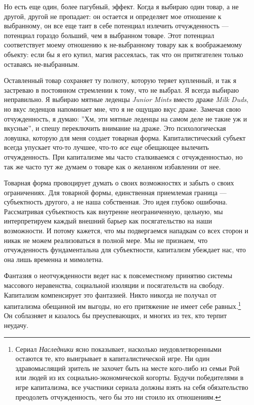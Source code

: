 \documentclass[12pt]{book}
\begin{document}
Но есть еще один, более пагубный, эффект. Когда я выбираю один товар, а не другой, другой не пропадает: он остается и определяет мое отношение к выбранному, он все еще таит в себе потенциал излечить отчужденность --- потенциал гораздо больший, чем в выбранном товаре. Этот потенциал соответствует моему отношению к не-выбранному товару как к воображаемому объекту: если бы я его купил, магия рассеялась, так что он притягателен только оставаясь не-выбранным.

Оставленный товар сохраняет ту полноту, которую теряет купленный, и так я застреваю в постоянном стремлении к тому, что не выбрал. Я всегда выбираю неправильно. Я выбираю мятные леденцы \textit{Junior Mints} вместо драже \textit{Milk Duds}, но вкус леденцов напоминает мне, что я не ощущаю вкус драже. Замечая свою отчужденность, я думаю: ''Хм, эти мятные леденцы на самом деле не такие уж и вкусные'', и спешу переключить внимание на драже. Это психологическая ловушка, которую для меня создает товарная форма. Капиталистический субъект всегда упускает что-то лучшее, что-то \textit{все еще} обещающее вылечить отчужденность. При капитализме мы часто сталкиваемся с отчужденностью, но так же часто тут же думаем о товаре как о желанном избавлении от нее.

Товарная форма провоцирует думать о своих возможностях и забыть о своих ограничениях. Для товарной формы, единственная приемлемая граница --- субъектность другого, а не наша собственная. Это идея глубоко ошибочна. Рассматривая субъектность как внутренне неограниченную, цельную, мы интерпретируем каждый внешний барьер как посягательство на наши возможности. И потому кажется, что мы подвергаемся нападкам со всех сторон и никак не можем реализоваться в полной мере. Мы не признаем, что отчужденность фундаментальна для субъектности, капитализм убеждает нас, что она лишь временна и мимолетна.

Фантазия о неотчужденности ведет нас к повсеместному принятию системы массового неравенства, социальной изоляции и посягательств на свободу. Капитализм компенсирует это фантазией. Никто никогда не получал от капитализма обещанной им выгоды, но его притяжение не имеет себе равных.\footnote{Сериал \textit{Наследники} ясно показывает, насколько неудовлетворенными остаются те, кто выигрывает в капиталистической игре. Ни один здравомыслящий зритель не захочет быть на месте кого-либо из семьи Рой или людей из их социально-экономической когорты. Будучи победителями в игре капитализма, все участники сериала должны взять на себя обязательство преодолеть отчужденность, чего бы это ни стоило их отношениям.} Он соблазняет и казалось бы преуспевающих, и многих из тех, кто терпит неудачу.
\end{document}

